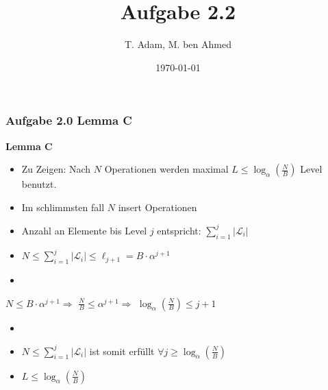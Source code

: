 \documentclass[aspectratio=169]{beamer}
\title[Aufgabe 1.1]{Aufgabe 2.2} %
\author{T. Adam, M. ben Ahmed} %
\institute[UOS] %
{

Universität Osnabrück \\ %

\medskip
\textit{Algorithm Engineering} %


}
\date{\today} %
\begin{document}
\begin{frame}
\titlepage %
\end{frame}





\begin{frame}
	\frametitle{Aufgabe 2.0 Lemma C}
	
	\textbf{Lemma C}
	\begin{itemize}
		\item Zu Zeigen: Nach $N$ Operationen werden maximal $L \leq \log_{\alpha}(\frac{N}{B})$ Level benutzt.
		\item Im schlimmsten fall $N$ insert Operationen
		\item Anzahl an Elemente bis Level $j$ entspricht: $ \sum_{i = 1}^{j} |\mathcal{L}_i|$
		\item $N \leq \sum_{i = 1}^{j} |\mathcal{L}_i| \leq \ell_{j+1} = B \cdot \alpha^{j+1}$
		\item[]
	\end{itemize}

		\quad $N \leq B \cdot \alpha^{j+1} \Rightarrow$ 
		$\frac{N}{B} \leq \alpha^{j+1} \Rightarrow$
		$\log_{\alpha}(\frac{N}{B}) \leq j + 1$ 
		
	\begin{itemize}
		\item[]
		\item $N \leq \sum_{i = 1}^{j} |\mathcal{L}_i|$ ist somit erfüllt $\forall j \geq \log_{\alpha}(\frac{N}{B})$
		\item $L \leq \log_{\alpha}(\frac{N}{B})$
	\end{itemize}
		
	
	\end{frame}
\end{document}
